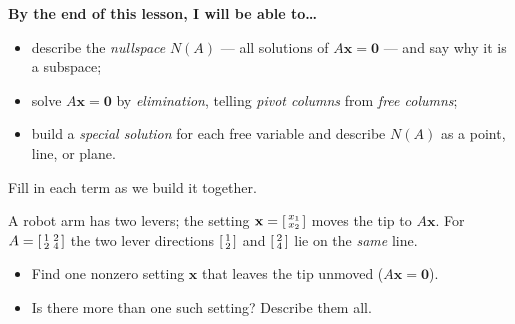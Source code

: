 \documentclass[10pt]{article}
\newcommand{\xx}{\mathbf{x}}
\newcommand{\zero}{\mathbf{0}}
\begin{document}
\namedateperiod

\vspace{0.12in}

\begin{objectivebox}
\textbf{By the end of this lesson, I will be able to\dots}
\begin{itemize}\setlength{\itemsep}{2pt}
  \item describe the \emph{nullspace} $N(A)$ --- all solutions of $A\xx=\zero$ --- and say why it is a subspace;
  \item solve $A\xx=\zero$ by \emph{elimination}, telling \emph{pivot columns} from \emph{free columns};
  \item build a \emph{special solution} for each free variable and describe $N(A)$ as a point, line, or plane.
\end{itemize}
\end{objectivebox}

\vspace{0.10in}

\begin{vocabbox}
\small
Fill in each term as we build it together.
\vspace{2pt}
\end{vocabbox}

\begin{hookbox}
A robot arm has two levers; the setting $\xx=\begin{bsmallmatrix} x_1\\x_2 \end{bsmallmatrix}$ moves the
tip to $A\xx$. For $A=\begin{bsmallmatrix} 1 & 2\\ 2 & 4 \end{bsmallmatrix}$ the two lever directions
$\begin{bsmallmatrix} 1\\2 \end{bsmallmatrix}$ and $\begin{bsmallmatrix} 2\\4 \end{bsmallmatrix}$ lie on
the \emph{same} line.
\begin{itemize}\setlength{\itemsep}{1pt}
  \item Find one nonzero setting $\xx$ that leaves the tip unmoved ($A\xx=\zero$). \writeline
  \item Is there more than one such setting? Describe them all. \writeline
\end{itemize}
\end{hookbox}
\end{document}
